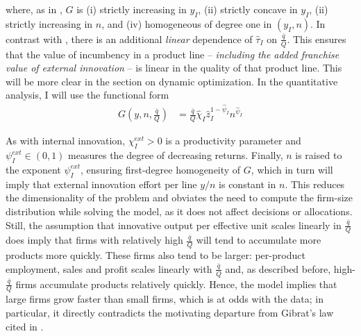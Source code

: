 \documentclass[12pt,english]{article}
\theoremstyle{remark}
\begin{document}
where, as in \cite{klette_innovating_2004}, $G$ is (i) strictly increasing in $y_I$, (ii) strictly concave in $y_I$, (ii) strictly increasing in $n$, and (iv) homogeneous of degree one in $(y_I,n)$. In contrast with \cite{klette_innovating_2004}, there is an additional \textit{linear} dependence of $\hat{\tau}_I$ on $\frac{\bar{q}}{Q}$. This ensures that the value of incumbency in a product line -- \textit{including the added franchise value of external innovation} -- is linear in the quality of that product line. This will be more clear in the section on dynamic optimization. In the quantitative analysis, I will use the functional form 
\begin{align}
	G(y,n,\frac{\bar{q}}{Q}) &= \frac{\bar{q}}{Q} \hat{\chi}_I \hat{z}_I^{1-\hat{\psi}_I} n^{\hat{\psi}_I} 
\end{align}

As with internal innovation, $\chi_I^{ext} > 0$ is a productivity parameter and $\psi_I^{ext} \in (0,1)$ measures the degree of decreasing returns. Finally, $n$ is raised to the exponent $\psi_I^{ext}$, ensuring first-degree homogeneity of $G$, which in turn will imply that external innovation effort per line $y/n$ is constant in $n$. This reduces the dimensionality of the problem and obviates the need to compute the firm-size distribution while solving the model, as it does not affect decisions or allocations. Still, the assumption that innovative output per effective unit scales linearly in $\frac{\bar{q}}{Q}$ does imply that firms with relatively high $\frac{\bar{q}}{Q}$ will tend to accumulate more products more quickly. These firms also tend to be larger: per-product employment, sales and profit scales linearly with $\frac{\bar{q}}{Q}$ and, as described before, high-$\frac{\bar{q}}{Q}$ firms accumulate products relatively quickly. Hence, the model implies that large firms grow faster than small firms, which is at odds with the data; in particular, it directly contradicts the motivating departure from Gibrat's law cited in \cite{akcigit_growth_2018}. 
\end{document}
